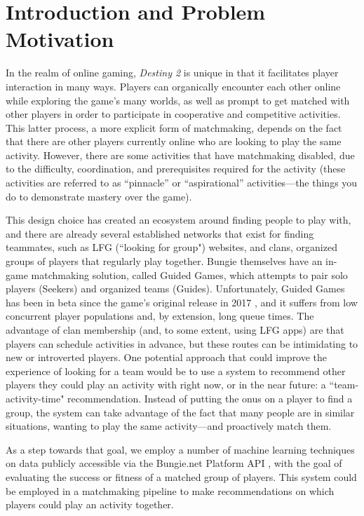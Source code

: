 \documentclass[conference]{IEEEtran}
\begin{document}
\section{Introduction and Problem Motivation}

In the realm of online gaming, \textit{Destiny 2} is unique in that it
facilitates player interaction in many ways. Players can organically encounter
each other online while exploring the game's many worlds, as well as prompt to
get matched with other players in order to participate in cooperative and
competitive activities. This latter process, a more explicit form of
matchmaking, depends on the fact that there are other players currently online
who are looking to play the same activity. However, there are some activities
that have matchmaking disabled, due to the difficulty, coordination, and
prerequisites required for the activity (these activities are referred to as
``pinnacle'' or ``aspirational'' activities—the things you do to demonstrate
mastery over the game).

This design choice has created an ecosystem around finding people to play with,
and there are already several established networks that exist for finding
teammates, such as LFG (``looking for group") websites, and clans, organized
groups of players that regularly play together. Bungie themselves have an
in-game matchmaking solution, called Guided Games, which attempts to pair solo
players (Seekers) and organized teams (Guides). Unfortunately, Guided Games has
been in beta since the game's original release in 2017 \cite{guided-games},
and it suffers from low concurrent player populations and, by extension, long
queue times. The advantage of clan membership (and, to some extent, using LFG
apps) are that players can schedule activities in advance, but these routes can
be intimidating to new or introverted players. One potential approach that
could improve the experience of looking for a team would be to use a system to
recommend other players they could play an activity with right now, or in the
near future: a ``team-activity-time" recommendation. Instead of putting the
onus on a player to find a group, the system can take advantage of the fact
that many people are in similar situations, wanting to play the same
activity—and proactively match them.

As a step towards that goal, we employ a number of machine learning techniques
on data publicly accessible via the Bungie.net Platform API
\cite{api}, with the goal of evaluating the success or fitness of a
matched group of players. This system could be employed in a matchmaking
pipeline to make recommendations on which players could play an activity
together.
\end{document}
